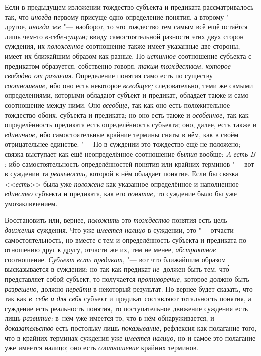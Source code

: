 Если в предыдущем изложении тождество субъекта и предиката рассматривалось так,
что {\em иногда} первому присуще одно определение понятия,
а второму "--- другое, {\em иногда же} "--- наоборот, то это тождество тем
самым всё ещё остаётся лишь чем-то {\em в-себе-сущим;} ввиду самостоятельной
разности этих двух сторон суждения, их {\em положенное} соотношение также имеет
указанные две стороны, имеет их ближайшим образом как разные. Но {\em истинное}
соотношение субъекта с предикатом образуется, собственно говоря,
{\em таким тождеством, которое свободно от различия}. Определение понятия само
есть по существу {\em соотношение,} ибо оно есть некоторое {\em всеобщее;}
следовательно, теми же самыми определениями, которыми обладают субъект и
предикат, обладает также и само соотношение между ними. Оно {\em всеобще,}
так как оно есть положительное тождество обоих, субъекта и предиката; но оно
есть также и {\em особенное},
так как определённость предиката есть определённость субъекта; оно, далее, есть
также и {\em единичное,} ибо самостоятельные крайние термины сняты в нём, как
в своём отрицательнее единстве. "--- Но в суждении это тождество ещё не
положено; связка выступает как ещё неопределённое соотношение {\em бытия}
вообще: $A$ {\em есть} $B$; ибо самостоятельность определённостей понятия или
крайних терминов "--- вот в суждении та {\em реальность,} которой в нём
обладает понятие. Если бы связка <<{\em есть}>> была уже {\em положена} как
указанное определённое и наполненное {\em единство} субъекта и предиката, как
его {\em понятие,} то суждение было бы уже умозаключением.

Восстановить или, вернее, {\em положить} это {\em тождество} понятия есть цель
{\em движения} суждения. Что уже {\em имеется налицо} в суждении,
это "--- отчасти самостоятельность, но вместе с тем и
определённость субъекта и предиката по отношению друг к другу, отчасти же
их, тем не менее, {\em абстрактное} соотношение.
{\em Субъект есть предикат,} "--- вот что ближайшим образом высказывается в
суждении; но так как предикат {\em не}~должен быть тем, чт\'{о}
представляет собой субъект, то получается {\em противоречие,} которое должно
быть {\em разрешено,} должно {\em перейти} в некоторый результат. Но вернее
будет сказать, что так как {\em в~себе и для себя} субъект и предикат
составляют тотальность понятия, а суждение есть реальность понятия, то
поступательное движение суждения есть лишь {\em развитие;} в~нём уже
имеется то, что в нём обнаруживается, и {\em доказательство} есть
постольку лишь {\em показывание,} рефлексия как полагание того, что в крайних
терминах суждения уже {\em имеется налицо;} но и самое это полагание уже
имеется налицо; оно есть {\em соотношение} крайних терминов.

